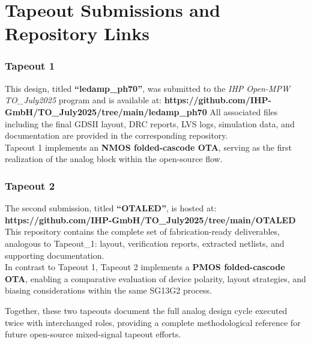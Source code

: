 \documentclass[
  11pt,
  a4paper,
  oneside]{scrbook}
\begin{document}
\cleardoublepage
{}
{}
\appendix

\chapter{Tapeout Submissions and Repository
Links}\label{tapeout-submissions-and-repository-links}

\subsection{\texorpdfstring{\textbf{Tapeout
1}}{Tapeout 1}}\label{tapeout-1}

This design, titled \textbf{``ledamp\_ph70''}, was submitted to the
\emph{IHP Open-MPW TO\_July2025} program and is available at:\newline
\textbf{https://github.com/IHP-GmbH/TO\_July2025/tree/main/ledamp\_ph70}\newline
All associated files including the final GDSII layout, DRC reports, LVS
logs, simulation data, and documentation are provided in the
corresponding repository.\\
Tapeout 1 implements an \textbf{NMOS folded-cascode OTA}, serving as the
first realization of the analog block within the open-source flow.

\subsection{\texorpdfstring{\textbf{Tapeout
2}}{Tapeout 2}}\label{tapeout-2}

The second submission, titled \textbf{``OTALED''}, is hosted
at:\newline 
\textbf{https://github.com/IHP-GmbH/TO\_July2025/tree/main/OTALED}\\
This repository contains the complete set of fabrication-ready
deliverables, analogous to Tapeout\_1: layout, verification reports,
extracted netlists, and supporting documentation.\\
In contrast to Tapeout 1, Tapeout 2 implements a \textbf{PMOS
folded-cascode OTA}, enabling a comparative evaluation of device
polarity, layout strategies, and biasing considerations within the same
SG13G2 process.

Together, these two tapeouts document the full analog design cycle
executed twice with interchanged roles, providing a complete
methodological reference for future open-source mixed-signal tapeout
efforts.
\end{document}

